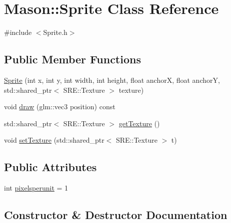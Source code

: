 \hypertarget{class_mason_1_1_sprite}{}\section{Mason\+:\+:Sprite Class Reference}
\label{class_mason_1_1_sprite}


{\ttfamily \#include $<$Sprite.\+h$>$}

\subsection*{Public Member Functions}
\begin{DoxyCompactItemize}
\item 
\hyperlink{class_mason_1_1_sprite_a40dbab8285c1d3bdc95dfe1806736402}{Sprite} (int x, int y, int width, int height, float anchorX, float anchorY, std\+::shared\+\_\+ptr$<$ S\+R\+E\+::\+Texture $>$ texture)
\item 
void \hyperlink{class_mason_1_1_sprite_a6229a8bef359a9023f6510978bd95b0b}{draw} (glm\+::vec3 position) const
\item 
std\+::shared\+\_\+ptr$<$ S\+R\+E\+::\+Texture $>$ \hyperlink{class_mason_1_1_sprite_a712bae6921e612c77150a2741a0be7b1}{get\+Texture} ()
\item 
void \hyperlink{class_mason_1_1_sprite_a0331c6ca9aeb29be568485209cabcf06}{set\+Texture} (std\+::shared\+\_\+ptr$<$ S\+R\+E\+::\+Texture $>$ t)
\end{DoxyCompactItemize}
\subsection*{Public Attributes}
\begin{DoxyCompactItemize}
\item 
int \hyperlink{class_mason_1_1_sprite_a5d5ba8a72349d94bbe9190efcb9715cc}{pixelsperunit} = 1
\end{DoxyCompactItemize}


\subsection{Constructor \& Destructor Documentation}
\hypertarget{class_mason_1_1_sprite_a40dbab8285c1d3bdc95dfe1806736402}{}\label{class_mason_1_1_sprite_a40dbab8285c1d3bdc95dfe1806736402} 
